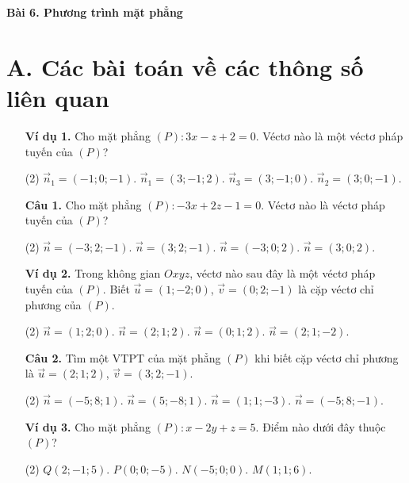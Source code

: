 \documentclass[12pt, a4paper]{article}
\renewcommand{\vec}[1]{\overrightarrow{#1}}
\begin{document}
\onehalfspacing

\begin{center}
    \huge\textbf{Bài 6. Phương trình mặt phẳng}
\end{center}

\section*{A. Các bài toán về các thông số liên quan}
\begin{enumerate}[label=\textbf{\arabic*.}, wide=0pt, leftmargin=*]
    \item[\textbf{Ví dụ 1.}] Cho mặt phẳng \((P) : 3x - z + 2 = 0\). Véctơ nào là một véctơ pháp tuyến của \((P)\)?
    \begin{tasks}(2)
        \task \(\vec{n}_1 = (-1;0;-1)\).
        \task \(\vec{n}_1 = (3;-1;2)\).
        \task \(\vec{n}_3 = (3;-1;0)\).
        \task \(\vec{n}_2 = (3;0;-1)\).
    \end{tasks}

    \item[\textbf{Câu 1.}] Cho mặt phẳng \((P): -3x + 2z - 1 = 0\). Véctơ nào là véctơ pháp tuyến của \((P)\)?
    \begin{tasks}(2)
        \task \(\vec{n} = (-3;2;-1)\).
        \task \(\vec{n} = (3;2;-1)\).
        \task \(\vec{n} = (-3;0;2)\).
        \task \(\vec{n} = (3;0;2)\).
    \end{tasks}
    
    \item[\textbf{Ví dụ 2.}] Trong không gian \(Oxyz\), véctơ nào sau đây là một véctơ pháp tuyến của \((P)\). Biết \(\vec{u} = (1;-2;0)\), \(\vec{v} = (0;2;-1)\) là cặp véctơ chỉ phương của \((P)\).
    \begin{tasks}(2)
        \task \(\vec{n} = (1;2;0)\).
        \task \(\vec{n} = (2;1;2)\).
        \task \(\vec{n} = (0;1;2)\).
        \task \(\vec{n} = (2;1;-2)\).
    \end{tasks}
    
    \item[\textbf{Câu 2.}] Tìm một VTPT của mặt phẳng \((P)\) khi biết cặp véctơ chỉ phương là \(\vec{u} = (2;1;2)\), \(\vec{v} = (3;2;-1)\).
    \begin{tasks}(2)
        \task \(\vec{n} = (-5;8;1)\).
        \task \(\vec{n} = (5;-8;1)\).
        \task \(\vec{n} = (1;1;-3)\).
        \task \(\vec{n} = (-5;8;-1)\).
    \end{tasks}

    \item[\textbf{Ví dụ 3.}] Cho mặt phẳng \((P) : x - 2y + z = 5\). Điểm nào dưới đây thuộc \((P)\)?
    \begin{tasks}(2)
        \task \(Q(2;-1;5)\).
        \task \(P(0;0;-5)\).
        \task \(N(-5;0;0)\).
        \task \(M(1;1;6)\).
    \end{tasks}


\end{enumerate}
\end{document}
